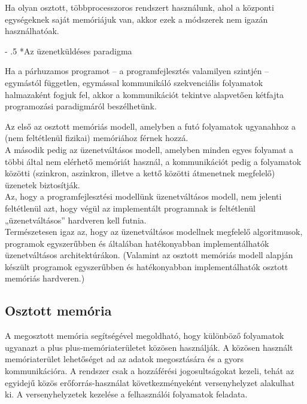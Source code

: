 \documentclass[tikz,12pt,margin=0px]{article}
\makeatletter
\renewcommand\paragraph{%
	\@startsection{paragraph}{4}{0mm}%
	{-\baselineskip}%
	{.5\baselineskip}%
	{\normalfont\normalsize\bfseries}}
\newcommand\lword[1]{\leavevmode\nobreak\hskip0pt plus\linewidth\penalty50\hskip0pt plus-\linewidth\nobreak #1}
\makeatother
\begin{document}
    \noindent Ha olyan osztott, többprocesszoros rendszert használunk, ahol a központi egységeknek saját memóriájuk van, akkor ezek a módszerek nem igazán használhatóak.

    \paragraph*{Az üzenetküldéses paradigma}

    Ha a párhuzamos programot – a programfejlesztés valamilyen szintjén – egymástól független, egymással kommunikáló szekvenciális folyamatok halmazaként fogjuk fel,  akkor  a  kommunikációt  tekintve  alapvetően  kétfajta  programozási  paradigmáról beszélhetünk.

    \noindent Az első az osztott memóriás modell, amelyben a futó folyamatok ugyanahhoz a (nem feltétlenül fizikai) memóriához férnek hozzá.\\

    \noindent A második pedig az üzenetváltásos modell, amelyben minden egyes folyamat a többi által nem elérhető memóriát használ, a kommunikációt pedig a folyamatok közötti (szinkron, aszinkron, illetve a kettő közötti átmenetnek  megfelelő)  üzenetek  biztosítják.\\

    \noindent Az, hogy a programfejlesztési modellünk üzenetváltásos modell, nem jelenti feltétlenül azt, hogy végül az implementált programnak is feltétlenül „üzenetváltásos” hardveren kell futnia.\\
    Természetesen igaz az, hogy az üzenetváltásos modellnek megfelelő algoritmusok, programok  egyszerűbben  és  általában  hatékonyabban  implementálhatók  üzenetváltásos architektúrákon.  (Valamint  az  osztott  memóriás  modell  alapján  készült  programok egyszerűbben és hatékonyabban implementálhatók osztott memóriás hardveren.)

	\subsection*{Osztott memória}

    A megosztott memória segítségével megoldható, hogy különböző folyamatok ugyanazt a \lword{memóriaterületet} közösen használják. A közösen használt memóriaterület lehetőséget ad az adatok megosztására és a gyors kommunikációra. A rendszer csak a hozzáférési jogosultságokat kezeli, tehát az egyidejű közös erőforrás-használat következményeként versenyhelyzet alakulhat ki. A versenyhelyzetek kezelése a felhasználói folyamatok feladata.\\
\end{document}
